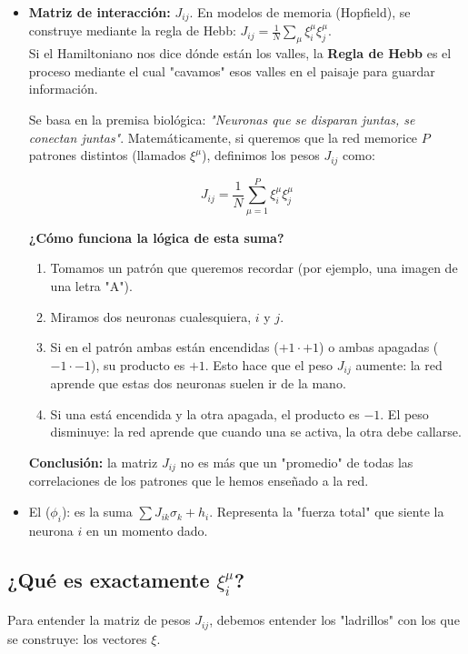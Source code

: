 \begin{itemize}
    \item \textbf{Matriz de interacción:} $J_{ij}$. En modelos de memoria (Hopfield), se construye mediante la regla de Hebb: $J_{ij} = \frac{1}{N} \sum_{\mu} \xi_i^\mu \xi_j^\mu$. \\
    \noindent
    Si el Hamiltoniano nos dice dónde están los valles, la \textbf{Regla de Hebb} es el proceso mediante el cual "cavamos" esos valles en el paisaje para guardar información.

    Se basa en la premisa biológica: \textit{"Neuronas que se disparan juntas, se conectan juntas"}. Matemáticamente, si queremos que la red memorice $P$ patrones distintos (llamados $\xi^\mu$), definimos los pesos $J_{ij}$ como:

    \begin{equation}
        J_{ij} = \frac{1}{N} \sum_{\mu=1}^{P} \xi_i^\mu \xi_j^\mu
    \end{equation}

    \textbf{¿Cómo funciona la lógica de esta suma?}
    \begin{enumerate}
        \item Tomamos un patrón que queremos recordar (por ejemplo, una imagen de una letra "A").
        \item Miramos dos neuronas cualesquiera, $i$ y $j$.
        \item Si en el patrón ambas están encendidas ($+1 \cdot +1$) o ambas apagadas ($-1 \cdot -1$), su producto es \textbf{$+1$}. Esto hace que el peso $J_{ij}$ aumente: la red aprende que estas dos neuronas suelen ir de la mano.
        \item Si una está encendida y la otra apagada, el producto es \textbf{$-1$}. El peso disminuye: la red aprende que cuando una se activa, la otra debe callarse.
    \end{enumerate}

    \textbf{Conclusión:} la matriz $J_{ij}$ no es más que un "promedio" de todas las correlaciones de los patrones que le hemos enseñado a la red.
    \item El  ($\phi_i$): es la suma $\sum J_{ik} \sigma_k + h_i$. Representa la "fuerza total" que siente la neurona $i$ en un momento dado.
\end{itemize}

\subsection{¿Qué es exactamente $\xi_i^\mu$?}
\noindent
Para entender la matriz de pesos $J_{ij}$, debemos entender los "ladrillos" con los que se construye: los vectores $\xi$. 


